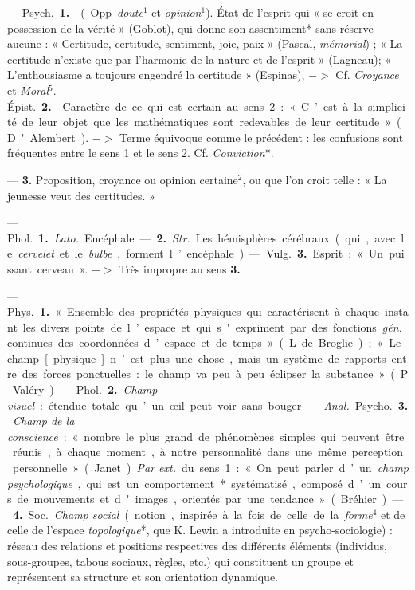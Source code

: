 \begin{itemize}[leftmargin=1cm, label=, itemsep=11pt]
 —  \si{Psych.} {\bf 1.}  (Opp.
{\it doute}$^1$ et {\it opinion}$^1$). État de l’esprit
qui « se croit en possession de la
vérité » (Goblot), qui donne son
assentiment* sans réserve aucune :
« Certitude, certitude, sentiment,
joie, paix » (Pascal, {\it mémorial}) ; « La
certitude n'existe que par l’harmonie de la nature et de l'esprit »
(Lagneau); « L’enthousiasme a toujours engendré la certitude » (Espinas), $->$ Cf. {\it Croyance} et {\it Moral}$^5$.
— \si{Épist.} {\bf 2.}  Caractère de ce qui
est certain au sens 2 : « C’est à la
simplicité de leur objet que les mathématiques sont redevables de leur
certitude » (D'Alembert). $->$ Terme
équivoque comme le précédent : les
confusions sont fréquentes entre le
sens 1 et le sens 2. Cf. {\it Conviction}*.

—  {\bf 3.} Proposition, croyance
ou opinion certaine$^2$, ou que l’on
croit telle : « La jeunesse veut des
certitudes. »

 — \si{Phol.} {\bf 1.}  {\it Lato.} Encéphale.
— {\bf 2.}  {\it Str.} Les hémisphères cérébraux
(qui, avec le {\it cervelet} et le {\it bulbe}, forment l’encéphale).

— \si{Vulg.} {\bf 3.} Esprit : « Un puissant cerveau ». $->$ Très impropre
au sens {\bf 3.}


 — \si{Phys.} {\bf 1.} « Ensemble des
propriétés physiques qui caractérisent à chaque instant les divers
points de l’espace et qui s'expriment
par des fonctions  {\it gén.} continues des
coordonnées d’espace et de temps »
(L. de Broglie); « Le champ [physique] n’est plus une chose, mais un
système de rapports entre des forces
ponctuelles : le champ va peu à peu
éclipser la substance » (P. Valéry).
— \si{Phol.} {\bf 2.} {\it Champ visuel} : étendue totale qu’un œil peut voir sans bouger.

— {\it Anal.} \si{Psycho.} {\bf 3.} {\it Champ de la
conscience} : « nombre le plus grand
de phénomènes simples qui peuvent
être réunis, à chaque moment, à
notre personnalité dans une même
perception personnelle » (Janet).
{\it Par ext.} du sens 1 : « On peut parler
d’un {\it champ psychologique}, qui est
un comportement* systématisé,
composé d’un cours de mouvements
et d'images, orientés par une tendance » (Bréhier). — {\bf 4.} \si{Soc.} {\it Champ
social} (notion, inspirée à la fois de
celle de la {\it forme}$^4$ et de celle de
l’espace {\it topologique}*, que K. Lewin
a introduite en psycho-sociologie) :
réseau des relations et positions respectives des différents éléments
(individus, sous-groupes, tabous sociaux, règles, etc.) qui constituent
un groupe et représentent sa structure et son orientation dynamique.


\end{itemize}

